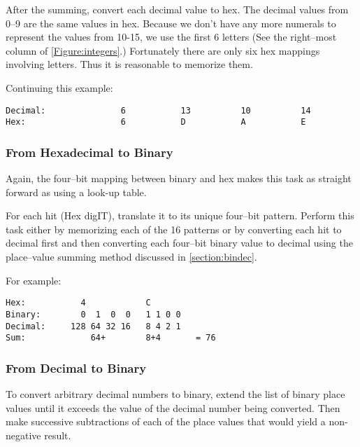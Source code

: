After the summing, convert each decimal value to hex.  The decimal
values from 0--9 are the same values in hex.  Because we don't have any
more numerals to represent the values from 10-15, we use the first 6
letters (See the right--most column of \autoref{Figure:integers}.)
Fortunately there are only six hex mappings involving letters.  Thus 
it is reasonable to memorize them.

Continuing this example:

\begin{verbatim}
Decimal:               6           13          10          14
Hex:                   6           D           A           E
\end{verbatim}



\subsubsection{From Hexadecimal to Binary}

Again, the four--bit mapping between binary and hex makes this
task as straight forward as using a look-up table.

For each \gls{hit} (Hex digIT), translate it to its unique four--bit pattern.
Perform this task either by memorizing each of the 16 patterns 
or by converting each hit to decimal first and then converting
each four--bit binary value to decimal using the place--value summing 
method discussed in \autoref{section:bindec}.

For example:

\begin{verbatim}
Hex:           4            C
Binary:        0  1  0  0   1 1 0 0
Decimal:     128 64 32 16   8 4 2 1
Sum:             64+        8+4       = 76
\end{verbatim}


\subsubsection{From Decimal to Binary}

To convert arbitrary decimal numbers to binary, extend the list 
of binary place values until it exceeds the value of the decimal 
number being converted.  Then make successive subtractions of each 
of the place values that would yield a non-negative result.

